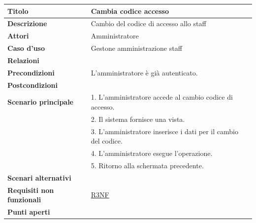 \documentclass[a4paper]{article}
\begin{document}
\begin{center}
\begin{tabularx}{1\textwidth}{|l|X|}
    \hline
	\textbf{Titolo} & Cambia codice accesso \\
	\hline
	\textbf{Descrizione} & Cambio del codice di accesso allo staff \\
	\hline
	\textbf{Attori} & Amministratore \\
	\hline
	\textbf{Caso d'uso} & Gestone amministrazione staff \\
	\hline
	\textbf{Relazioni} &  \\
	\hline
	\textbf{Precondizioni} &  L'amministratore è già autenticato. \\
	\hline
	\textbf{Postcondizioni} &  \\
	\hline
	\textbf{Scenario principale} & 1. L'amministratore accede al cambio codice di accesso. \\
								 & 2. Il sistema fornisce una vista. \\
								 & 3. L'amministratore inserisce i dati per il cambio del codice. \\
								 & 4. L'amministratore esegue l'operazione.\\
								 & 5. Ritorno alla schermata precedente.\\
	\hline
	\textbf{Scenari alternativi} & \\
	\hline
	\textbf{Requisiti non funzionali} & \hyperlink{R3NF}{R3NF} \\
	\hline
	\textbf{Punti aperti} & \\
	\hline
\end{tabularx}
\end{center}

\end{document}
